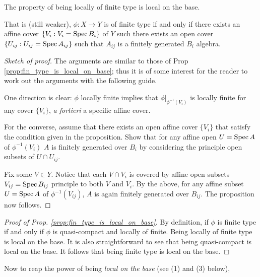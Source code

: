 \begin{prop}
The property of being locally of finite type is local on the base.

That is (still weaker), $\phi: X \to Y$ is of finite type if and 
only if there exists an affine cover $\{V_i : V_i = \mathrm{Spec}\, B_i\}$ 
of $Y$ such there exists an open cover $\{U_{ij} : U_{ij} = \mathrm{Spec}\, 
A_{ij}\}$ such that $A_{ij}$ is a finitely generated $B_i$ 
algebra.
\end{prop}
\begin{proof}[Sketch of proof]
The arguments are similar to those of Prop 
\ref{prop:fin_type_is_local_on_base}; thus it is of some interest
for the reader to work out the arguments with the following guide.

One direction is clear: $\phi$ locally finite implies that 
$\phi|_{\phi^{-1}(V_i)}$ is locally finite for any cover $\{V_i\}$,
\emph{a fortieri} a specific affine cover.

For the converse, assume that there exists an open affine cover 
$\{V_i\}$ that satisfy the condition given in the proposition.
Show that for any affine open $U = \mathrm{Spec}\, A$ of $\phi^{-1}(V_i)$
$A$ is finitely generated over $B_i$ by considering the principle
open subsets of $U \cap U_{ij}$.

Fix some $V \in Y$. Notice that each $V \cap V_i$ is covered by
affine open subsets $V_{ij} = \mathrm{Spec}\, B_{ij}$ principle to both $V$ 
and $V_i$. By the above, for any affine subset $U = \mathrm{Spec}\, A$ of 
$\phi^{-1}(V_{ij})$, $A$ is again finitely generated over $B_{ij}$.
The proposition now follows.
\end{proof}

\begin{proof}[Proof of Prop. \ref{prop:fin_type_is_local_on_base}]
By definition, if $\phi$ is finite type if and only if $\phi$ is 
quasi-compact and locally of finite. Being locally of finite type
is local on the base. It is also straightforward to see that being 
quasi-compact is local on the base. It follows that being finite
type is local on the base.
\end{proof}

Now to reap the power of being \emph{local on the base} (see 
(1) and (3) below),

